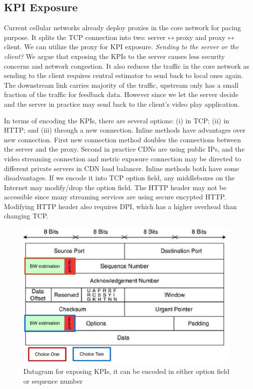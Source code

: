 \subsection{KPI Exposure}\label{subsec:exposingAPI}
Current cellular networks already deploy proxies in the core network for
pacing purpose.\cite{UntoldMiddleBoxStory} It splits the TCP connection into two: server$\leftrightarrow
$proxy and proxy$\leftrightarrow $client. We can utilize the proxy for KPI
exposure. \emph{Sending to the server or the client?} We argue that exposing the
KPIs to the server causes less security concerns and network congestion. It also reduces the traffic in
the core network as sending to the client requires central estimator to send
back to local ones again. The downstream link carries majority of the traffic, upstream only has a small fraction of the traffic for feedback data. 
However since we let the server decide and the server in practice
may send back to the client's video play application. 

In terms of encoding the KPIs, there are several options: (i) in TCP; (ii) in
HTTP; and (iii) through a new connection. Inline methods have advantages over
new connection. First new connection method doubles the connections between the
server and the proxy. Second in practice CDNs are using public IPs, and the
video streaming connection and metric exposure connection may be directed to different private servers in CDN
load balancer. Inline methods both have some disadvantages. 
If we encode it into TCP option field, any middleboxes on the Internet may modify/drop the option field. 
The HTTP header may not be accessible since many streaming
services are using secure encypted HTTP. Modifying HTTP header also requires DPI, which has a higher overhead than changing TCP.
\begin{figure}[t]\label{fig:Datagram}
 \includegraphics[width=\linewidth]{datagram.pdf}
 \caption{Datagram for exposing KPIs, it can be encoded in either option field or sequence number}
\end{figure}

